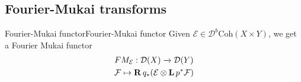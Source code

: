 


\subsection{Fourier-Mukai transforms}

\begin{definition}{Fourier-Mukai functor}{Fourier-Mukai functor}
    Given $\mathcal{E}\in \mathcal{D}^b\mathrm{Coh}(X\times Y)$, we get a Fourier Mukai functor $$\begin{gathered}
    FM_{\mathcal{E}}:\mathcal{D}(X)\xrightarrow{}\mathcal{D}(Y)\\
    \mathcal{F}\mapsto \operatorname{\mathbf{R}} q_{*}(\mathcal{E}\otimes \operatorname{\mathbf{L}} p^*\mathcal{F})
    \end{gathered}$$  
\end{definition}

